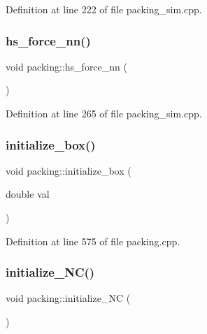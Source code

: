 Definition at line 222 of file packing\+\_\+sim.\+cpp.

\mbox{\label{classpacking_aee29c91dd4747aca62cfecfb5197f87a}} 
\subsubsection{\texorpdfstring{hs\+\_\+force\+\_\+nn()}{hs\_force\_nn()}}
{\footnotesize\ttfamily void packing\+::hs\+\_\+force\+\_\+nn (\begin{DoxyParamCaption}{ }\end{DoxyParamCaption})}



Definition at line 265 of file packing\+\_\+sim.\+cpp.

\mbox{\label{classpacking_a16af9b32d0aa64fe236bc73ca5b98248}} 
\subsubsection{\texorpdfstring{initialize\+\_\+box()}{initialize\_box()}}
{\footnotesize\ttfamily void packing\+::initialize\+\_\+box (\begin{DoxyParamCaption}\item[{double}]{val }\end{DoxyParamCaption})}



Definition at line 575 of file packing.\+cpp.

\mbox{\label{classpacking_a00d1be8bf289c4a8a29fa915c9db13e9}} 
\subsubsection{\texorpdfstring{initialize\+\_\+\+N\+C()}{initialize\_NC()}}
{\footnotesize\ttfamily void packing\+::initialize\+\_\+\+NC (\begin{DoxyParamCaption}{ }\end{DoxyParamCaption})\hspace{0.3cm}{\ttfamily [inline]}}



